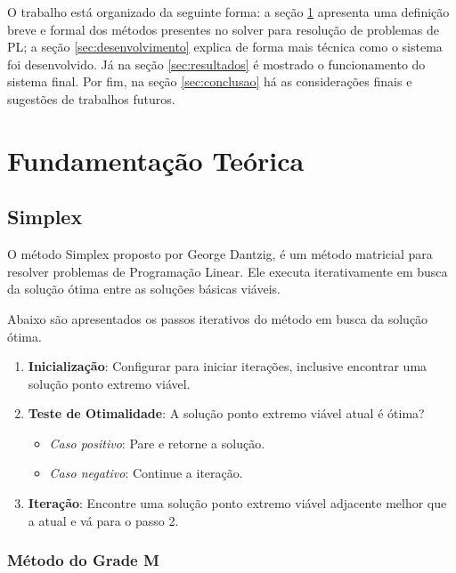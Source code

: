 \documentclass [11pt]{articleSBPO}
\begin{document}
O trabalho está organizado da seguinte forma: a seção \ref{sec:fundamentacao} apresenta uma definição breve e formal dos métodos presentes no solver para resolução de problemas de PL; a seção \ref{sec:desenvolvimento} explica de forma mais técnica como o sistema foi desenvolvido. Já na seção \ref{sec:resultados} é mostrado o funcionamento do sistema final. Por fim, na seção \ref{sec:conclusao} há as considerações finais e sugestões de trabalhos futuros.

\section{Fundamentação Teórica}\label{sec:fundamentacao}


\subsection{Simplex}\label{subsec:simplex}

O método Simplex proposto por George Dantzig, é um método matricial para resolver problemas de Programação Linear. Ele executa iterativamente em busca da solução ótima entre as soluções básicas viáveis. 

Abaixo são apresentados os passos iterativos do método em busca da solução ótima.

\begin{enumerate}
	\item \textbf{Inicialização}: Configurar para iniciar iterações, inclusive encontrar uma solução ponto extremo viável.
	\item \textbf{Teste de Otimalidade}: A solução ponto extremo viável atual é ótima?
	\begin{itemize}
		\item \textit{Caso positivo}: Pare e retorne a solução.
		\item \textit{Caso negativo}: Continue a iteração.
	\end{itemize}
	\item \textbf{Iteração}: Encontre uma solução ponto extremo viável adjacente melhor que a atual e vá para o passo 2.
\end{enumerate}

\subsubsection{Método do Grade M}\label{subsubsec:grandem}
\end{document}
